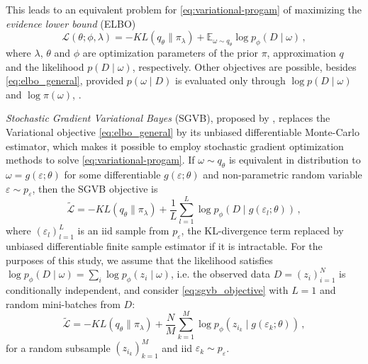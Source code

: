 \documentclass[a4paper,10pt,onecolumn]{article}
\newcommand{\important}[1]{\textbf{\!\colorbox{red}{#1}\!}}
\newcommand{\todo}[1]{{\color{blue} [TODO]} \important{#1}}
\begin{document}
This leads to an equivalent problem for \eqref{eq:variational-progam} of maximizing
the \textit{evidence lower bound} (ELBO)
\begin{equation}  \label{eq:elbo_general}
  \mathcal{L}(\theta; \phi, \lambda)
    = - KL(q_{\theta} \| \pi_{\lambda})
      + \mathbb{E}_{\omega \sim q_{\theta}}
        \log p_{\phi}(D \mid \omega)
  \,,
\end{equation}
where $\lambda$, $\theta$ and $\phi$ are optimization parameters of the prior $\pi$,
approximation $q$ and the likelihood $p(D\mid \omega)$, respectively. Other objectives
are possible, besides \eqref{eq:elbo_general}, provided $p(\omega \mid D)$ is evaluated
only through $\log p(D \mid \omega)$ and $\log \pi(\omega)$, \citep{ranganath_operator_2018}.

\textit{Stochastic Gradient Variational Bayes} (SGVB), proposed by \citet{kingma_auto-encoding_2014},
replaces the Variational objective \eqref{eq:elbo_general} by its unbiased differentiable
Monte-Carlo estimator, which makes it possible to employ stochastic gradient optimization
methods to solve \eqref{eq:variational-progam}. If $
  \omega \sim q_{\theta}
$ is equivalent in distribution to $
  \omega = g(\varepsilon; \theta)
$ for some differentiable $
  g(\varepsilon; \theta)
$ and non-parametric random variable $
    \varepsilon \sim p_\varepsilon
$, then the SGVB objective is
\begin{equation}  \label{eq:sgvb_objective}
  \widetilde{\mathcal{L}} %
    = - KL(q_{\theta} \| \pi_{\lambda})
      + \frac1{L} \sum_{l=1}^L
        \log p_{\phi}(D \mid g(\varepsilon_{l}; \theta))
    \,, 
\end{equation}
where $
  (\varepsilon_{l})_{l=1}^L
$ is an iid sample from $p_\varepsilon$, the KL-divergence term replaced by unbiased
differentiable finite sample estimator if it is intractable.
%
For the purposes of this study, we assume that the likelihood satisfies $
  \log p_\phi(D\mid \omega)
    = \sum_i \log p_\phi(z_i \mid \omega)
$, i.e. the observed data $
  D = (z_i)_{i=1}^N
$ is conditionally independent, and consider \eqref{eq:sgvb_objective} with $L=1$
and random mini-batches from $D$:
\begin{equation}  \label{eq:elbo}
  \widetilde{\mathcal{L}} %
    = - KL(q_{\theta} \| \pi_{\lambda})
      + \frac{N}{M} \sum_{k=1}^M
        \log p_{\phi}(z_{i_k} \mid g(\varepsilon_k; \theta))
    \,,
\end{equation}
for a random subsample $(z_{i_k})_{k=1}^M$ and iid $\varepsilon_k \sim p_\varepsilon$.
%
\end{document}
